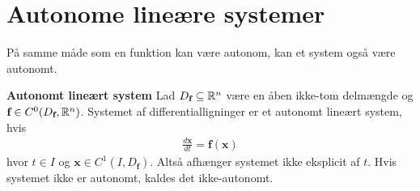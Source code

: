\section{Autonome lineære systemer}
På samme måde som en funktion kan være autonom, kan et system også være autonomt.

\begin{minipage}\textwidth
\begin{defn}\textbf{Autonomt lineært system} %
\newline \label{def:definition_lineært_autonomt_system}
Lad $D_\textbf{f} \subseteq \mathbb{R}^n$ være en åben ikke-tom delmængde og $\textbf{f}\in C^0(D_\textbf{f},\mathbb{R}^n)$. Systemet af differentialligninger er et autonomt lineært system, hvis
\begin{align*}
    \frac{d\textbf{x}}{dt} = \textbf{f}(\textbf{x})
\end{align*}
hvor $t \in I$ og $\textbf{x}\in C^1(I, D_\textbf{f})$. Altså afhænger systemet ikke eksplicit af $t$. Hvis systemet ikke er autonomt, kaldes det ikke-autonomt. 
\end{defn}
\end{minipage}




